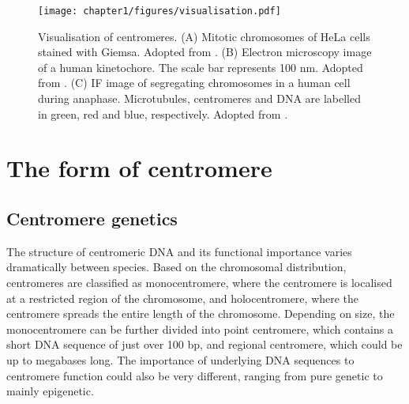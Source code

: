 \begin{figure}[htbp]
  \centering
  \texttt{[image: chapter1/figures/visualisation.pdf]}
  \caption[Visualisation of centromeres]{Visualisation of centromeres. (A) Mitotic chromosomes of HeLa cells stained with Giemsa. Adopted from \cite{Diaz-Martinez2007CohesinCells}. (B) Electron microscopy image of a human kinetochore. The scale bar represents 100 \si{\nano\metre}. Adopted from \cite{Cheeseman2008MolecularInterface}. (C) IF image of segregating chromosomes in a human cell during anaphase. Microtubules, centromeres and DNA are labelled in green, red and blue, respectively. Adopted from \cite{McKinley2015}. }
  \label{fig:visualisation}
\end{figure}

\section{The form of centromere}
\subsection{Centromere genetics}

The structure of centromeric DNA and its functional importance varies dramatically between species. Based on the chromosomal distribution, centromeres are classified as monocentromere, where the centromere is localised at a restricted region of the chromosome, and holocentromere, where the centromere spreads the entire length of the chromosome. Depending on size, the monocentromere can be further divided into point centromere, which contains a short DNA sequence of just over 100 bp, and regional centromere, which could be up to megabases long. The importance of underlying DNA sequences to centromere function could also be very different, ranging from pure genetic to mainly epigenetic. 

